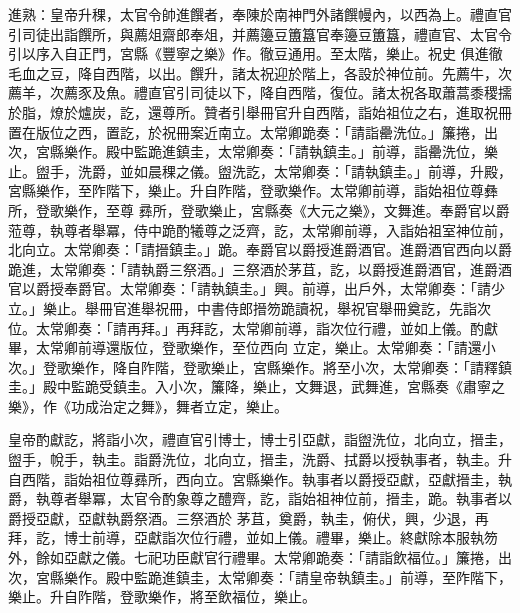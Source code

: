 \begin{pinyinscope}
 進熟：皇帝升稞，太官令帥進饌者，奉陳於南神門外諸饌幔內，以西為上。禮直官引司徒出詣饌所，與薦俎齋郎奉俎，并薦籩豆簠簋官奉籩豆簠簋，禮直官、太官令引以序入自正門，宮縣《豐寧之樂》作。徹豆通用。至太階，樂止。祝史
 俱進徹毛血之豆，降自西階，以出。饌升，諸太祝迎於階上，各設於神位前。先薦牛，次薦羊，次薦豕及魚。禮直官引司徒以下，降自西階，復位。諸太祝各取蕭蒿黍稷擩於脂，燎於爐炭，訖，還尊所。贊者引舉冊官升自西階，詣始祖位之右，進取祝冊置在版位之西，置訖，於祝冊案近南立。太常卿跪奏：「請詣罍洗位。」簾捲，出次，宮縣樂作。殿中監跪進鎮圭，太常卿奏：「請執鎮圭。」前導，詣罍洗位，樂止。盥手，洗爵，並如晨稞之儀。盥洗訖，太常卿奏：「請執鎮圭。」前導，升殿，宮縣樂作，至阼階下，樂止。升自阼階，登歌樂作。太常卿前導，詣始祖位尊彝所，登歌樂作，至尊
 彞所，登歌樂止，宮縣奏《大元之樂》，文舞進。奉爵官以爵蒞尊，執尊者舉冪，侍中跪酌犧尊之泛齊，訖，太常卿前導，入詣始祖室神位前，北向立。太常卿奏：「請搢鎮圭。」跪。奉爵官以爵授進爵酒官。進爵酒官西向以爵跪進，太常卿奏：「請執爵三祭酒。」三祭酒於茅苴，訖，以爵授進爵酒官，進爵酒官以爵授奉爵官。太常卿奏：「請執鎮圭。」興。前導，出戶外，太常卿奏：「請少立。」樂止。舉冊官進舉祝冊，中書侍郎搢笏跪讀祝，舉祝官舉冊奠訖，先詣次位。太常卿奏：「請再拜。」再拜訖，太常卿前導，詣次位行禮，並如上儀。酌獻畢，太常卿前導還版位，登歌樂作，至位西向
 立定，樂止。太常卿奏：「請還小次。」登歌樂作，降自阼階，登歌樂止，宮縣樂作。將至小次，太常卿奏：「請釋鎮圭。」殿中監跪受鎮圭。入小次，簾降，樂止，文舞退，武舞進，宮縣奏《肅寧之樂》，作《功成治定之舞》，舞者立定，樂止。



 皇帝酌獻訖，將詣小次，禮直官引博士，博士引亞獻，詣盥洗位，北向立，搢圭，盥手，帨手，執圭。詣爵洗位，北向立，搢圭，洗爵、拭爵以授執事者，執圭。升自西階，詣始祖位尊彞所，西向立。宮縣樂作。執事者以爵授亞獻，亞獻搢圭，執爵，執尊者舉冪，太官令酌象尊之醴齊，訖，詣始祖神位前，搢圭，跪。執事者以爵授亞獻，亞獻執爵祭酒。三祭酒於
 茅苴，奠爵，執圭，俯伏，興，少退，再拜，訖，博士前導，亞獻詣次位行禮，並如上儀。禮畢，樂止。終獻除本服執笏外，餘如亞獻之儀。七祀功臣獻官行禮畢。太常卿跪奏：「請詣飲福位。」簾捲，出次，宮縣樂作。殿中監跪進鎮圭，太常卿奏：「請皇帝執鎮圭。」前導，至阼階下，樂止。升自阼階，登歌樂作，將至飲福位，樂止。




\end{pinyinscope}
